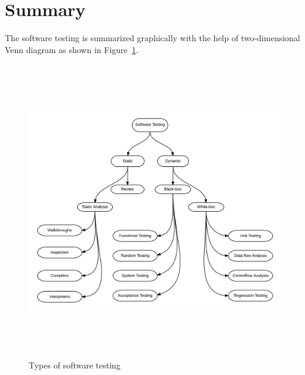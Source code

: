 




\clearpage
\newpage
\section{Summary}
The software testing is summarized graphically with the help of two-dimensional Venn diagram as shown in Figure~\ref{fig:testDataGenerators_2}. 

\begin{figure}[h]
	\centering
	\centerline{\includegraphics[width=15.5cm, height=13cm ]{chapter2/testingTypes.png}}
	\bigskip
	\caption{Types of software testing}
	\label{fig:testDataGenerators_2}
\end{figure}

